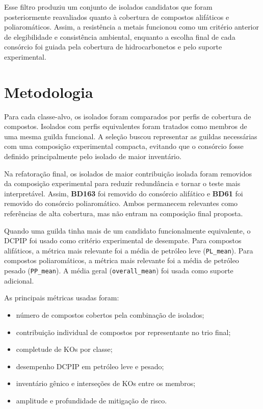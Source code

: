 \documentclass[12pt,a4paper]{article}
\begin{document}
Esse filtro produziu um conjunto de isolados candidatos que foram posteriormente reavaliados quanto à cobertura de compostos alifáticos e poliaromáticos. Assim, a resistência a metais funcionou como um critério anterior de elegibilidade e consistência ambiental, enquanto a escolha final de cada consórcio foi guiada pela cobertura de hidrocarbonetos e pelo suporte experimental.

\section{Metodologia}

Para cada classe-alvo, os isolados foram comparados por perfis de cobertura de compostos. Isolados com perfis equivalentes foram tratados como membros de uma mesma guilda funcional. A seleção buscou representar as guildas necessárias com uma composição experimental compacta, evitando que o consórcio fosse definido principalmente pelo isolado de maior inventário.

Na refatoração final, os isolados de maior contribuição isolada foram removidos da composição experimental para reduzir redundância e tornar o teste mais interpretável. Assim, \textbf{BD163} foi removido do consórcio alifático e \textbf{BD61} foi removido do consórcio poliaromático. Ambos permanecem relevantes como referências de alta cobertura, mas não entram na composição final proposta.

Quando uma guilda tinha mais de um candidato funcionalmente equivalente, o DCPIP foi usado como critério experimental de desempate. Para compostos alifáticos, a métrica mais relevante foi a média de petróleo leve (\texttt{PL\_mean}). Para compostos poliaromáticos, a métrica mais relevante foi a média de petróleo pesado (\texttt{PP\_mean}). A média geral (\texttt{overall\_mean}) foi usada como suporte adicional.

As principais métricas usadas foram:

\begin{itemize}
    \item número de compostos cobertos pela combinação de isolados;
    \item contribuição individual de compostos por representante no trio final;
    \item completude de KOs por classe;
    \item desempenho DCPIP em petróleo leve e pesado;
    \item inventário gênico e interseções de KOs entre os membros;
    \item amplitude e profundidade de mitigação de risco.
\end{itemize}
\end{document}
